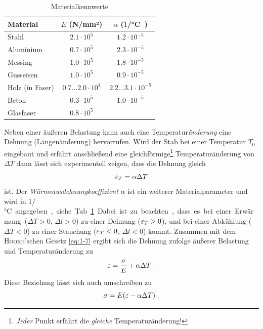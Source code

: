 \begin{table}[h!]
	\centering
	\caption{Materialkennwerte}
	\begin{tabular}{l c c}
		\toprule
		Material	& $E$ (\unit{N/mm²}) & $\alpha$ (\unit{$1$/°C})  \\
		\midrule
		Stahl		& $2.1\cdot 10^5$	& $1.2\cdot 10^{-5}$ \\
		Aluminium	& $0.7\cdot 10^5$	& $2.3\cdot 10^{-5}$ \\
		Messing		& $1.0\cdot 10^5$	& $1.8\cdot 10^{-5}$ \\
		Gusseisen	& $1.0\cdot 10^5$	& $0.9\cdot 10^{-5}$ \\
		\midrule
		Holz (in Faser)		& $0.7\hdots 2.0\cdot 10^4$	& $2.2\hdots3.1\cdot 10^{-5}$ \\
		Beton		& $0.3\cdot 10^5$	& $1.0\cdot 10^{-5}$ \\
		Glasfaser	& $0.8\cdot 10^5$	& \\
		\bottomrule
	\end{tabular}
\label{tab:1-1}
\end{table}


Neben einer äußeren Belastung kann auch eine Temperatur\emph{änderung} eine Dehnung (Längenänderung) hervorrufen.
Wird der Stab bei einer Temperatur $T_0$ eingebaut und erfährt anschließend eine gleichförmige\footnote{\emph{Jeder} Punkt erfährt die \emph{gleiche} Temperaturänderung!} Temperaturänderung von $\Delta T$ dann lässt sich experimentell zeigen, dass die Dehnung gleich
%
\begin{equation}
\varepsilon_T = \alpha\Delta T
\label{eq:1-8}
\end{equation}
%
ist.
Der \emph{Wärmeausdehnungkoeffizient} $\alpha$ ist ein weiterer Materialparameter und wird in \unit{$1$/°C} angegeben, siehe Tab.~\ref{tab:1-1}.
Dabei ist zu beachten, dass es bei einer Erwärmung ($\Delta T>0$, $\Delta l>0$) zu einer Dehnung ($\varepsilon_T>0$), und bei einer Abkühlung ($\Delta T<0$) zu einer Stauchung ($\varepsilon_T<0$, $\Delta l<0$) kommt.
Zusammen mit dem  \textsc{Hooke}'schen Gesetz \eqref{eq:1-7} ergibt sich die Dehnung zufolge äußerer Belastung und Temperaturänderung zu
%
\begin{equation}
\varepsilon = \dfrac{\sigma}{E} + \alpha\Delta T \; .
\label{eq:1-9}
\end{equation}
%
Diese Beziehung lässt sich auch umschreiben zu
%
\begin{equation}
\sigma = E(\varepsilon-\alpha \Delta T) \; .
\label{eq:1-10}
\end{equation}
% 

